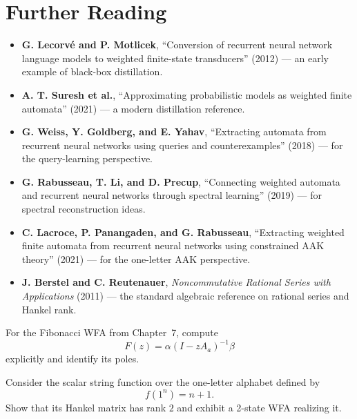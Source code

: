 \section*{Further Reading}

\begin{itemize}
  \item \textbf{G. Lecorvé and P. Motlicek}, ``Conversion of recurrent neural network language models to weighted finite-state transducers'' (2012) \cite{LecorveMotlicek2012} --- an early example of black-box distillation.
  \item \textbf{A. T. Suresh et al.}, ``Approximating probabilistic models as weighted finite automata'' (2021) \cite{SureshEtAl2021} --- a modern distillation reference.
  \item \textbf{G. Weiss, Y. Goldberg, and E. Yahav}, ``Extracting automata from recurrent neural networks using queries and counterexamples'' (2018) \cite{WeissGoldbergYahav2018} --- for the query-learning perspective.
  \item \textbf{G. Rabusseau, T. Li, and D. Precup}, ``Connecting weighted automata and recurrent neural networks through spectral learning'' (2019) \cite{RabusseauLiPrecup2019} --- for spectral reconstruction ideas.
  \item \textbf{C. Lacroce, P. Panangaden, and G. Rabusseau}, ``Extracting weighted finite automata from recurrent neural networks using constrained AAK theory'' (2021) \cite{LacrocePanangadenRabusseau2021} --- for the one-letter AAK perspective.
  \item \textbf{J. Berstel and C. Reutenauer}, \emph{Noncommutative Rational Series with Applications} (2011) \cite{BerstelReutenauer2011} --- the standard algebraic reference on rational series and Hankel rank.
\end{itemize}

\begin{exercise}
For the Fibonacci WFA from Chapter~7, compute
\[
  F(z)=\alpha(I-zA_a)^{-1}\beta
\]
explicitly and identify its poles.
\end{exercise}

\begin{exercise}
Consider the scalar string function over the one-letter alphabet defined by
\[
  f(1^n)=n+1.
\]
Show that its Hankel matrix has rank $2$ and exhibit a 2-state WFA realizing it.
\end{exercise}

